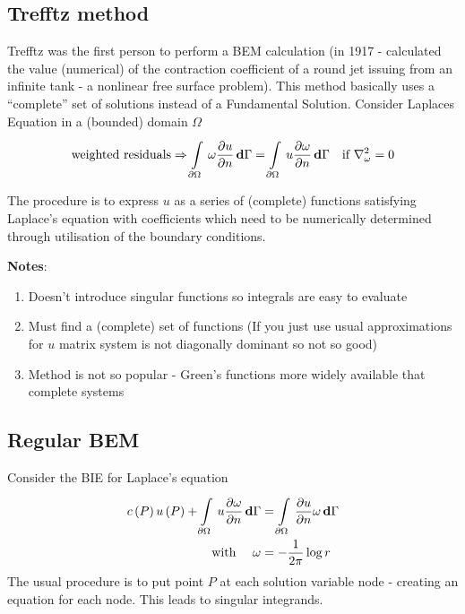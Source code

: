 \subsection{Trefftz method}

Trefftz was the first person to perform a BEM
calculation (in 1917 - calculated the value (numerical) of the contraction
coefficient of a round jet issuing from an infinite tank - a nonlinear free
surface problem).  This method basically uses a ``complete'' set of solutions
instead of a Fundamental Solution.  \eg Consider Laplaces Equation in a
(bounded) domain $\Omega$
\begin{equation*}
    \text{weighted residuals} \Rightarrow \gint{\del\Omega}{}{\omega 
    \delby{u}{n}}{\Gamma} = \gint{\del\Omega}{}{u \delby{\omega}{n}}{\Gamma} 
    \quad \text{if $\laplacian{\omega}=0$}
\end{equation*}

The procedure is to express $u$ as a series of (complete) functions satisfying
Laplace's equation with coefficients which need to be numerically determined
through utilisation of the boundary conditions.

\textbf{Notes}:
\begin{enumerate}
\item Doesn't introduce singular functions so integrals are easy to evaluate
\item Must find a (complete) set of functions (If you just use usual
  approximations for $u$ matrix system is not diagonally dominant so not so
  good)
\item Method is not so popular - Green's functions more widely available that
  complete systems
\end{enumerate}

\subsection{Regular BEM}

Consider the BIE for Laplace's equation
\begin{align*}
   c\left( P \right)   u\left( P \right)  +   \displaystyle\int\limits_{\partial\Omega}^{} \,u  \dfrac{\partial \omega}{\partial n} \, \boldsymbol{\mathrm{d}} \Gamma  &=
    \displaystyle\int\limits_{\partial\Omega}^{} \, \dfrac{\partial u}{\partial n} \omega\, \boldsymbol{\mathrm{d}} \Gamma  \\ \text{with } \quad \omega &=
  -\dfrac{1}{2\pi} \log r
\end{align*}
The usual procedure is to put point $P$ at each solution variable node - creating
an equation for each node. This leads to singular integrands.

